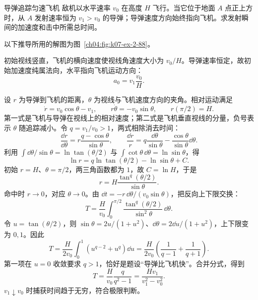 {\begin{origexamplebox}{导弹追踪匀速飞机}\label{ch04:ex:k07-2-88}
敌机以水平速率 $v_0$ 在高度 $H$ 飞行。当它位于地面 $A$ 点正上方时，从 $A$ 发射速率恒为 $v_1>v_0$ 的导弹；导弹速度方向始终指向飞机。求发射瞬间的加速度和击中所需总时间。

\begin{qualityfigure}
\label{mech:04:88:q}
\end{qualityfigure}
\end{origexamplebox}
\begin{xesolution}
以下推导所用的解图为图~\ref{ch04:fig:k07-ex-2-88}。

初始视线竖直，飞机的横向速度使视线角速度大小为 $v_0/H$。导弹速率恒定，故初始加速度纯属法向，水平指向飞机运动方向：
\PursuitDiagram
\[
\boxed{a_0=v_1\frac{v_0}{H}}.
\]

设 $r$ 为导弹到飞机的距离，$\theta$ 为视线与飞机速度方向的夹角。相对运动满足
\[
\dot r=v_0\cos\theta-v_1,
\qquad r\dot\theta=-v_0\sin\theta,
\qquad r(\pi/2)=H.
\]
第一式是飞机与导弹在视线上的相对速度；第二式是飞机垂直视线的分量，负号表示 $\theta$ 随追踪减小。令 $q=v_1/v_0>1$，两式相除消去时间：
\[
\frac{\dd r}{\dd\theta}
=r\frac{q-\cos\theta}{\sin\theta},\qquad
\frac{\dd r}{r}=q\frac{\dd\theta}{\sin\theta}
-\frac{\cos\theta}{\sin\theta}\dd\theta.
\]
利用 $\int\dd\theta/\sin\theta=\ln\tan(\theta/2)$ 与 $\int\cot\theta\,\dd\theta=\ln\sin\theta$，得
\[
\ln r=q\ln\tan(\theta/2)-\ln\sin\theta+C.
\]
初始 $r=H$、$\theta=\pi/2$，两三角函数都为 $1$，故 $C=\ln H$，于是
\[
r=H\frac{\tan^q(\theta/2)}{\sin\theta}.
\]
命中时 $r\to0$，对应 $\theta\to0$。由 $\dd t=-r\,\dd\theta/(v_0\sin\theta)$，把反向上下限交换：
\[
T=\frac H{v_0}\int_0^{\pi/2}
\frac{\tan^q(\theta/2)}{\sin^2\theta}\,\dd\theta.
\]
令 $u=\tan(\theta/2)$，则 $\sin\theta=2u/(1+u^2)$、$\dd\theta=2\dd u/(1+u^2)$，上下限变为 $0,1$。因此
\[
T=\frac H{2v_0}\int_0^1(u^{q-2}+u^q)\dd u
=\frac H{2v_0}\left(\frac1{q-1}+\frac1{q+1}\right).
\]
第一项在 $u=0$ 收敛要求 $q>1$，恰好是题设“导弹比飞机快”。合并分式，得到
\[
T=\frac{H}{v_0}\frac{q}{q^2-1}
=\boxed{\frac{Hv_1}{v_1^2-v_0^2}}.
\]
$v_1\downarrow v_0$ 时捕获时间趋于无穷，符合极限判断。
\end{xesolution}
}

